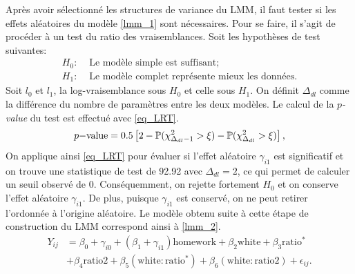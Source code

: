 \documentclass{article}
\begin{document}
		Après avoir sélectionné les structures de variance du LMM, il faut tester si les effets aléatoires du modèle \eqref{lmm_1} sont nécessaires. Pour se faire, il s'agit de procéder à un test du ratio des vraisemblances. 
		Soit les hypothèses de test suivantes:
		\begin{align*}
			H_0: &\text{ Le modèle simple est suffisant;}\\
			H_1: &\text{ Le modèle complet représente mieux les données.}
		\end{align*}
		Soit $l_0$ et $l_1$, la log-vraisemblance sous $H_0$ et celle sous $H_1$. On définit  $\Delta_{dl}$ comme la différence du nombre de paramètres entre les deux modèles.
		Le calcul de la \textit{$p$-value} du test est effectué avec \eqref{eq_LRT}.
		\begin{equation}\label{eq_LRT}
			p\mathrm{-value} = 0.5\left[2- \P(\chi^2_{\Delta_{dl} - 1} > \xi) - \P(\chi^2_{\Delta_{dl}} > \xi)\right],
		\end{equation} 
		On applique ainsi \eqref{eq_LRT} pour évaluer si l'effet aléatoire $\gamma_{i1}$ est significatif et on trouve une statistique de test de 92.92 avec $\Delta_{dl}=2$, ce qui permet de calculer un seuil observé de 0. Conséquemment, on rejette fortement $H_0$ et on conserve l'effet aléatoire $\gamma_{i1}$. De plus, puisque $\gamma_{i1}$ est conservé, on ne peut retirer l'ordonnée à l'origine aléatoire. Le modèle obtenu suite à cette étape de construction du LMM correspond ainsi à \eqref{lmm_2}.
		\begin{align}\label{lmm_2}
			Y_{ij} &= \beta_0+\gamma_{i0} + (\beta_1 + \gamma_{i1}) \mathrm{homework} + \beta_2 \mathrm{white} + \beta_3 \mathrm{ratio^*} \\
			&+ \beta_4 \mathrm{ratio2} + \beta_5 (\mathrm{white:ratio^*}) + \beta_6 (\mathrm{white:ratio2}) + \epsilon_{ij}. \nonumber
		\end{align}
		
\end{document}
